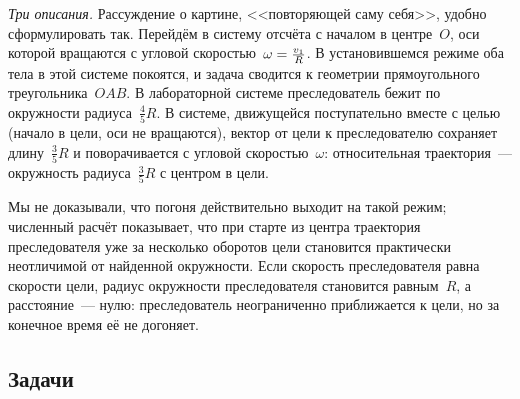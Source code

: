 \documentclass[../main.tex]{subfiles}
\begin{document}
\begin{example}
\noindent\textit{Три описания.} Рассуждение о картине, <<повторяющей саму себя>>,
удобно сформулировать так. Перейдём в систему отсчёта с началом в центре~$O$, оси
которой вращаются с угловой скоростью~$\omega \hm= \frac{v_1}{R}$. В установившемся
режиме оба тела в этой системе покоятся, и задача сводится к геометрии
прямоугольного треугольника~$OAB$. В лабораторной системе преследователь бежит по
окружности радиуса~$\frac{4}{5}R$. В системе, движущейся поступательно вместе с целью
(начало в цели, оси не вращаются), вектор от цели к преследователю сохраняет длину~$\frac{3}{5}R$ и поворачивается с угловой скоростью~$\omega$: относительная
траектория~--- окружность радиуса~$\frac{3}{5}R$ с центром в цели.
\end{example}

Мы не доказывали, что погоня действительно выходит на такой режим; численный расчёт
показывает, что при старте из центра траектория преследователя уже за несколько
оборотов цели становится практически неотличимой от найденной окружности. Если
скорость преследователя равна скорости цели, радиус окружности преследователя
становится равным~$R$, а расстояние~--- нулю: преследователь неограниченно
приближается к цели, но за конечное время её не догоняет.

\subsection{Задачи}
\end{document}
